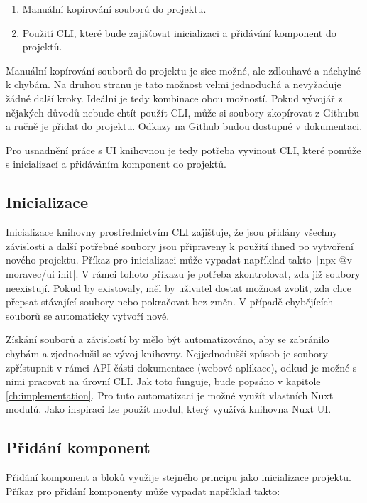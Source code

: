 \begin{enumerate}
  \item Manuální kopírování souborů do projektu.
  \item Použití CLI, které bude zajišťovat inicializaci a přidávání komponent do projektů.
\end{enumerate}

Manuální kopírování souborů do projektu je sice možné, ale zdlouhavé a náchylné k chybám. Na druhou stranu je tato možnost velmi jednoduchá a nevyžaduje žádné další kroky. Ideální je tedy kombinace obou možností.
Pokud vývojář z nějakých důvodů nebude chtít použít CLI, může si soubory zkopírovat z Githubu a ručně je přidat do projektu. Odkazy na Github budou dostupné v dokumentaci.

Pro usnadnění práce s UI knihovnou je tedy potřeba vyvinout CLI, které pomůže s inicializací a přidáváním komponent do projektů.

\subsection{Inicializace}
Inicializace knihovny prostřednictvím CLI zajišťuje, že jsou přidány všechny závislosti a další potřebné soubory jsou připraveny k použití ihned po vytvoření nového projektu. Příkaz pro inicializaci může vypadat například takto \texttt|npx @v-moravec/ui init|. V rámci tohoto příkazu je potřeba zkontrolovat, zda již soubory neexistují. Pokud by existovaly, měl by uživatel dostat možnost zvolit, zda chce přepsat stávající soubory nebo pokračovat bez změn. V případě chybějících souborů se automaticky vytvoří nové.

Získání souborů a závislostí by mělo být automatizováno, aby se zabránilo chybám a zjednodušil se vývoj knihovny. Nejjednodušší způsob je soubory zpřístupnit v rámci API části dokumentace (webové aplikace), odkud je možné s nimi pracovat na úrovní CLI. Jak toto funguje, bude popsáno v kapitole \ref{ch:implementation}. Pro tuto automatizaci je možné využít vlastních Nuxt modulů. Jako inspiraci lze použít modul, který využívá knihovna Nuxt UI. \cite{NuxtUISourceCodeModule}

\subsection{Přidání komponent}
Přidání komponent a bloků využije stejného principu jako inicializace projektu. Příkaz pro přidání komponenty může vypadat například takto:\\

